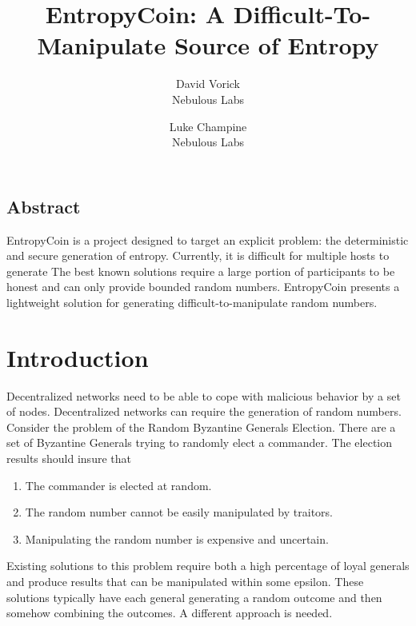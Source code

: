 \documentclass[twocolumn]{article}
\begin{document}
\frenchspacing

\title{EntropyCoin: A Difficult-To-Manipulate Source of Entropy}

\author{
{\rm David Vorick}\\
Nebulous Labs
}
\author{
{\rm Luke Champine}\\
Nebulous Labs
}

\maketitle

\subsection*{Abstract}
EntropyCoin is a project designed to target an explicit problem: the deterministic and secure generation of entropy.
Currently, it is difficult for multiple hosts to generate 
The best known solutions require a large portion of participants to be honest and can only provide bounded random numbers.
EntropyCoin presents a lightweight solution for generating difficult-to-manipulate random numbers.

\section{Introduction}
Decentralized networks need to be able to cope with malicious behavior by a set of nodes.
Decentralized networks can require the generation of random numbers.
Consider the problem of the Random Byzantine Generals Election.
There are a set of Byzantine Generals trying to randomly elect a commander.
The election results should insure that
\begin{enumerate}
	\item The commander is elected at random.
	\item The random number cannot be easily manipulated by traitors.
	\item Manipulating the random number is expensive and uncertain.
\end{enumerate}

Existing solutions to this problem require both a high percentage of loyal generals and produce results that can be manipulated within some epsilon.
These solutions typically have each general generating a random outcome and then somehow combining the outcomes.
A different approach is needed.
\end{document}
